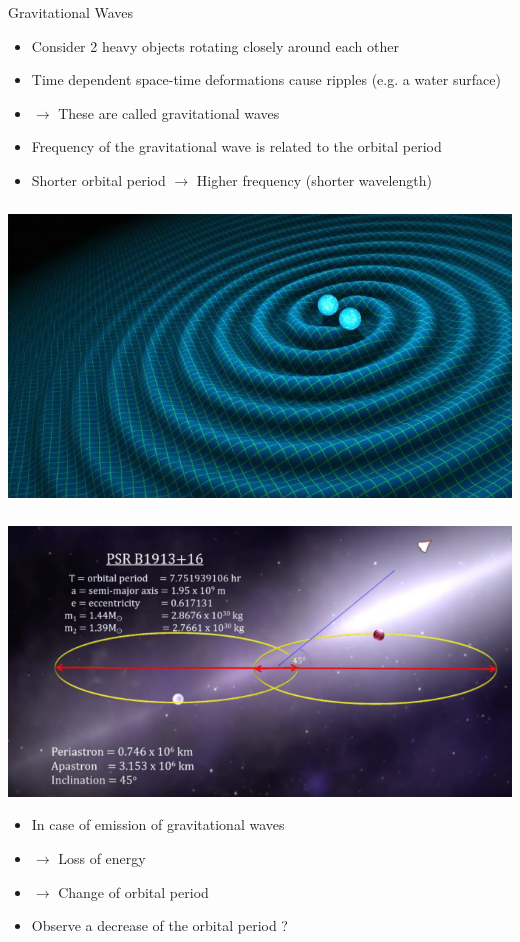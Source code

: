 \Tr
\onecolumn
\begin{center}
{\blue Gravitational Waves}
\end{center}
%
\begin{itemize}
\item Consider 2 heavy objects rotating closely around each other
\item[] Time dependent space-time deformations cause ripples (e.g. a water surface)
\item[] $\rightarrow$ These are called {\red gravitational waves}
\item Frequency of the gravitational wave is related to the orbital period
\item[] Shorter orbital period $\rightarrow$ Higher frequency (shorter wavelength)
\end{itemize}
%
\begin{center}
\includegraphics[keepaspectratio,height=8cm]{spiral-waves}
\end{center}

\Tr
{}%
\begin{center}
\includegraphics[keepaspectratio,width=15cm]{Hulse-Taylor-psr}
\end{center}
%
\begin{itemize}
\item In case of emission of gravitational waves
\item[] $\rightarrow$ Loss of energy
\item[] $\rightarrow$ Change of orbital period
\item Observe a decrease of the orbital period ?
\end{itemize}



